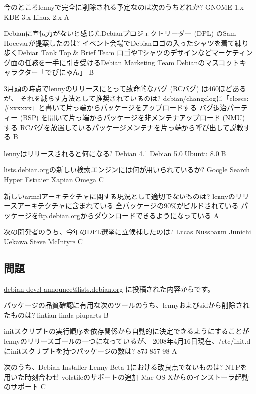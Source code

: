 \documentclass[mingoth,a4paper]{jsarticle}
\begin{document}
\begin{multicols}{2}
 \santaku
 {今のところlennyで完全に削除される予定なのは次のうちどれか?}
 {GNOME 1.x}
 {KDE 3.x}
 {Linux 2.x}
 {A}
 
 \santaku
 {Debianに宣伝力がないと感じたDebianプロジェクトリーダー (DPL) のSam Hocevarが提案したのは?}
 {イベント会場でDebianロゴの入ったシャツを着て練り歩くDebian Tank Top \& Brief Team}
 {ロゴやTシャツのデザインなどマーケティング面の任務を一手に引き受けるDebian Marketing Team}
 {Debianのマスコットキャラクター「でびにゃん」}
 {B}
 
 \santaku
 {3月頭の時点でlennyのリリースにとって致命的なバグ (RCバグ) は460ほどあるが、
 それを減らす方法として推奨されているのは?}
 {debian/changelogに「closes: \#xxxxxx」と書いて片っ端からパッケージをアップロードする}
 {バグ退治パーティー (BSP) を開いて片っ端からパッケージを非メンテナアップロード (NMU) する}
 {RCバグを放置しているパッケージメンテナを片っ端から呼び出して説教する}
 {B}
 
 \santaku
 {lennyはリリースされると何になる?}
 {Debian 4.1}
 {Debian 5.0}
 {Ubuntu 8.0}
 {B}
 
 \santaku
 {lists.debian.orgの新しい検索エンジンには何が用いられているか?}
 {Google Search}
 {Hyper Estraier}
 {Xapian Omega}
 {C}
 
 \santaku
 {新しいarmelアーキテクチャに関する現況として適切でないものは?}
 {lennyのリリースアーキテクチャに含まれている}
 {全パッケージの90\%がビルドされている}
 {パッケージをftp.debian.orgからダウンロードできるようになっている}
 {A}
 
 \santaku
 {次の開発者のうち、今年のDPL選挙に立候補したのは?}
 {Lucas Nussbaum}
 {Junichi Uekawa}
 {Steve McIntyre}
 {C}

\subsection{問題}
\url{debian-devel-announce@lists.debian.org} に投稿された内容からです。
 
 \santaku
 {パッケージの品質確認に有用な次のツールのうち、lennyおよびsidから削除されたものは?}
 {lintian}
 {linda}
 {piuparts}
 {B}
 
 \santaku
 {initスクリプトの実行順序を依存関係から自動的に決定できるようにすることがlennyのリリースゴールの一つになっているが、
 2008年4月16日現在、/etc/init.dにinitスクリプトを持つパッケージの数は?}
 {873}%
 {857}%
 {98}%
 {A}
 
 \santaku
 {次のうち、Debian Installer Lenny Beta 1における改良点でないものは?}
 {NTPを用いた時刻合わせ}
 {volatileのサポートの追加}
 {Mac OS Xからのインストーラ起動のサポート}
 {C}
 

\end{multicols}
\end{document}
